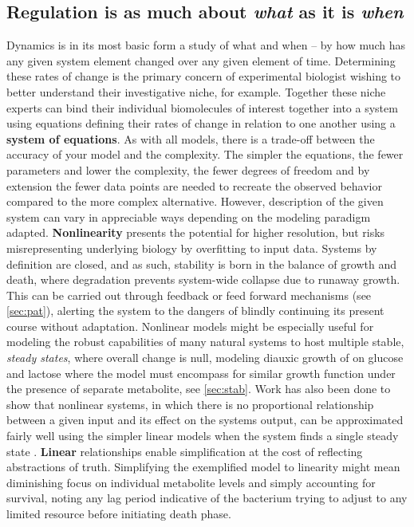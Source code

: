 \subsection{Regulation is as much about \emph{what} as it is \emph{when}}
\label{sec:regwhatwhen}
Dynamics is in its most basic form a study of what and when -- by how much has any given system element changed over any given element of time. Determining these rates of change is the primary concern of experimental biologist wishing to better understand their investigative niche, for example. Together these niche experts can bind their individual biomolecules of interest together into a system using equations defining their rates of change in relation to one another using a \textbf{system of equations}. As with all models, there is a trade-off between the accuracy of your model and the complexity. The simpler the equations, \ie the fewer parameters and lower the complexity, the fewer degrees of freedom and by extension the fewer data points are needed to recreate the observed behavior compared to the more complex alternative. However, description of the given system can vary in appreciable ways depending on the modeling paradigm adapted. 
\textbf{Nonlinearity} presents the potential for higher resolution, but risks misrepresenting underlying biology by overfitting to input data. Systems by definition are closed, and as such, stability is born in the balance of growth and death, where degradation prevents system-wide collapse due to runaway growth\cite{alon2007design}. This can be carried out through feedback or feed forward mechanisms (see \cref{sec:pat}), alerting the system to the dangers of blindly continuing its present course without adaptation. Nonlinear models might be especially useful for modeling the robust capabilities of many natural systems to host multiple stable, \emph{steady states}, where overall change is null, \eg modeling diauxic growth of \coli on glucose and lactose \cite{wong1997mathematical} where the model must encompass for similar growth function under the presence of separate metabolite, see \cref{sec:stab}. 
Work has also been done to show that nonlinear systems, in which there is no proportional relationship between a given input and its effect on the systems output, can be approximated fairly well using the simpler linear models when the system finds a single steady state \citep{wildenhain2006reconstructing, crampin2006system}.  \textbf{Linear} relationships enable simplification at the cost of reflecting abstractions of truth. Simplifying the exemplified model to linearity might mean diminishing focus on individual metabolite levels and simply accounting for survival, \eg noting any lag period indicative of the bacterium trying to adjust to any limited resource before initiating death phase.


